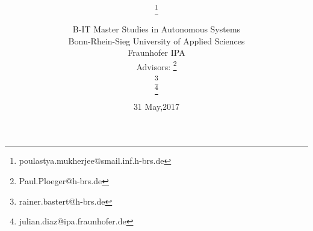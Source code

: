 \title{\PaperTitle\\\PaperSubject}
\author{\href{\PaperMainWriterEMail}{\PaperMainWriter \footnote{\href{\PaperMainWriterEMail} {poulastya.mukherjee@smail.inf.h-brs.de}} 
}\\%
\vspace{0.5cm} \\ 
B-IT Master Studies in Autonomous Systems \vspace{0.5cm} \\ 
Bonn-Rhein-Sieg University of Applied Sciences  \vspace{1.6cm}\\
Fraunhofer IPA \vspace{0.7cm} \\ \setcounter{footnote}{6}
Advisors: \href{\PaperLecturerEMail}{\PaperLecturer \footnote{\href{\PaperLecturerEMail} {Paul.Ploeger@h-brs.de}}}\\ %
\hspace{0.35cm}\href{\SecondAdvisorEMail}{\SecondAdvisor \footnote{\href{\SecondAdvisorEMail} {rainer.bastert@h-brs.de}}}\\
\hspace{0.35cm}\href{\ThirdAdvisorEMail}{\ThirdAdvisor \footnote{\href{\ThirdAdvisorEMail} {julian.diaz@ipa.fraunhofer.de}}}
}%
\date{31 May,2017}
\maketitle
